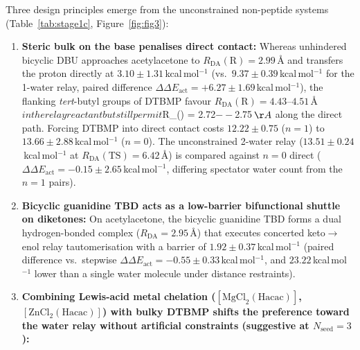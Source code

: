 \documentclass[11pt,a4paper]{article}
\begin{document}
Three design principles emerge from the unconstrained non-peptide systems (Table~\ref{tab:stage1c}, Figure~\ref{fig:fig3}):
\begin{enumerate}
\item \textbf{Steric bulk on the base penalises direct contact:}
Whereas unhindered bicyclic DBU approaches acetylacetone to $R_{\text{DA}}(\text{R}) = 2.99$\,\AA{} and transfers the proton directly at $3.10 \pm 1.31$\,kcal\,mol$^{-1}$ (vs.\ $9.37 \pm 0.39$\,kcal\,mol$^{-1}$ for the 1-water relay, paired difference $\Delta\Delta E_{\text{act}} = +6.27 \pm 1.69$\,kcal\,mol$^{-1}$), the flanking \textit{tert}-butyl groups of DTBMP favour $R_{\text{DA}}(\text{R}) = 4.43$--$4.51$\,\AA{}$ in the relay reactant but still permit $R_{}() = 2.72$--$2.75$\,\AA{}$ along the direct path. Forcing DTBMP into direct contact costs $12.22 \pm 0.75$ ($n=1$) to $13.66 \pm 2.88$\,kcal\,mol$^{-1}$ ($n=0$). The unconstrained 2-water relay ($13.51 \pm 0.24$\,kcal\,mol$^{-1}$ at $R_{\text{DA}}(\text{TS}) = 6.42$\,\AA{}) is compared against $n=0$ direct ($\Delta\Delta E_{\text{act}} = -0.15 \pm 2.65$\,kcal\,mol$^{-1}$, differing spectator water count from the $n=1$ pairs).
\item \textbf{Bicyclic guanidine TBD acts as a low-barrier bifunctional shuttle on diketones:}
On acetylacetone, the bicyclic guanidine TBD forms a dual hydrogen-bonded complex ($R_{\text{DA}} = 2.95$\,\AA{}) that executes concerted keto$\to$enol relay tautomerisation with a barrier of $\mathbf{1.92 \pm 0.37}$\,kcal\,mol$^{-1}$ (paired difference vs.\ stepwise $\Delta\Delta E_{\text{act}} = -0.55 \pm 0.33$\,kcal\,mol$^{-1}$, and $23.22$\,kcal\,mol$^{-1}$ lower than a single water molecule under distance restraints).
\item \textbf{Combining Lewis-acid metal chelation ($[\text{MgCl}_2(\text{Hacac})]$, $[\text{ZnCl}_2(\text{Hacac})]$) with bulky DTBMP shifts the preference toward the water relay without artificial constraints (suggestive at $N_{\text{seed}} = 3$):}

\end{enumerate}
\end{document}
